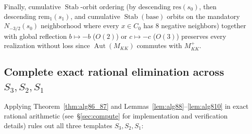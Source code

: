 \documentclass[11pt,reqno]{amsart}
\theoremstyle{definition}
\theoremstyle{remark}
\numberwithin{equation}{section}
\numberwithin{table}{section}
\begin{document}
Finally, cumulative $\operatorname{Stab}$-orbit ordering (by descending $\mathrm{res}(s_0)$, then descending $\mathrm{rem}_1(s_1)$, and cumulative $\operatorname{Stab}(\text{base})$ orbits on the mandatory $N_{-3/2}(s_0)$ neighborhood where every $x \in C_0$ has $8$ negative neighbors) together with global reflection $b \mapsto -b$ ($O(2)$) or $c \mapsto -c$ ($O(3)$) preserves every realization without loss since $\operatorname{Aut}(M_{KK})$ commutes with $M_{KK}^+$.

\subsection{Complete exact rational elimination across \texorpdfstring{$S_3, S_2, S_1$}{S3, S2, S1}}
Applying Theorem~\ref{thm:alg86_87} and Lemmas~\ref{lem:alg88}--\ref{lem:alg810} in exact rational arithmetic (see~\S\ref{sec:compute} for implementation and verification details) rules out all three templates $S_3, S_2, S_1$:
\end{document}
